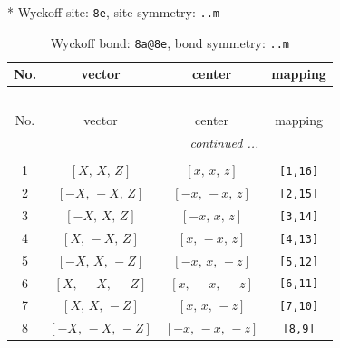\documentclass[fleqn,8pt]{jsarticle}
\begin{document}
* Wyckoff site: {\tt 8e}, site symmetry: {\tt ..m}
\renewcommand{\arraystretch}{1.2}
\begin{longtable}{cccc}
\caption{Wyckoff bond: {\tt 8a@8e}, bond symmetry: {\tt ..m}}
 \\
 \hline \hline
No. & vector & center & mapping \\ \hline \endfirsthead

\multicolumn{3}{l}{\tablename\ \thetable{}} \\
 \hline \hline
No. & vector & center & mapping \\ \hline \endhead

 \hline \hline
\multicolumn{3}{r}{\footnotesize\it continued ...} \\ \endfoot

 \hline \hline
\multicolumn{3}{r}{} \\ \endlastfoot

1 & $\left[ X,\, X,\, Z \right]$ & $\left[ x,\, x,\, z \right]$ & {\tt [1,16]} \\ \hline
2 & $\left[ - X,\, - X,\, Z \right]$ & $\left[ - x,\, - x,\, z \right]$ & {\tt [2,15]} \\ \hline
3 & $\left[ - X,\, X,\, Z \right]$ & $\left[ - x,\, x,\, z \right]$ & {\tt [3,14]} \\ \hline
4 & $\left[ X,\, - X,\, Z \right]$ & $\left[ x,\, - x,\, z \right]$ & {\tt [4,13]} \\ \hline
5 & $\left[ - X,\, X,\, - Z \right]$ & $\left[ - x,\, x,\, - z \right]$ & {\tt [5,12]} \\ \hline
6 & $\left[ X,\, - X,\, - Z \right]$ & $\left[ x,\, - x,\, - z \right]$ & {\tt [6,11]} \\ \hline
7 & $\left[ X,\, X,\, - Z \right]$ & $\left[ x,\, x,\, - z \right]$ & {\tt [7,10]} \\ \hline
8 & $\left[ - X,\, - X,\, - Z \right]$ & $\left[ - x,\, - x,\, - z \right]$ & {\tt [8,9]} \\
\end{longtable}
\renewcommand{\arraystretch}{1.2}
\end{document}
